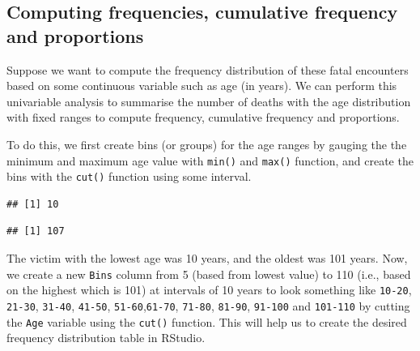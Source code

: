 \documentclass[
]{book}
\newenvironment{Shaded}{\begin{snugshade}}{\end{snugshade}}
\newcommand{\FunctionTok}[1]{\textcolor[rgb]{0.00,0.00,0.00}{#1}}
\newcommand{\NormalTok}[1]{#1}
\newcommand{\SpecialCharTok}[1]{\textcolor[rgb]{0.00,0.00,0.00}{#1}}
\begin{document}
\hypertarget{computing-frequencies-cumulative-frequency-and-proportions}{%
\subsection{Computing frequencies, cumulative frequency and proportions}\label{computing-frequencies-cumulative-frequency-and-proportions}}

Suppose we want to compute the frequency distribution of these fatal encounters based on some continuous variable such as age (in years). We can perform this univariable analysis to summarise the number of deaths with the age distribution with fixed ranges to compute frequency, cumulative frequency and proportions.

To do this, we first create bins (or groups) for the age ranges by gauging the the minimum and maximum age value with \texttt{min()} and \texttt{max()} function, and create the bins with the \texttt{cut()} function using some interval.

\begin{Shaded}
\end{Shaded}

\begin{verbatim}
## [1] 10
\end{verbatim}

\begin{Shaded}
\end{Shaded}

\begin{verbatim}
## [1] 107
\end{verbatim}

The victim with the lowest age was 10 years, and the oldest was 101 years. Now, we create a new \texttt{Bins} column from 5 (based from lowest value) to 110 (i.e., based on the highest which is 101) at intervals of 10 years to look something like \texttt{10-20}, \texttt{21-30}, \texttt{31-40}, \texttt{41-50}, \texttt{51-60},\texttt{61-70}, \texttt{71-80}, \texttt{81-90}, \texttt{91-100} and \texttt{101-110} by cutting the \texttt{Age} variable using the \texttt{cut()} function. This will help us to create the desired frequency distribution table in RStudio.
\end{document}
